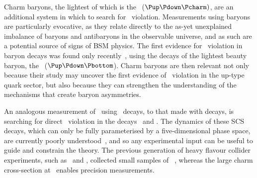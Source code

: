 
Charm baryons, the lightest of which is the \PLambdac~($\Pup\Pdown\Pcharm)$, 
are an additional system in which to search for \CP\ violation.
Measurements using baryons are particularly evocative, as they relate directly 
to the as-yet unexplained imbalance of baryons and antibaryons in the 
observable universe, and as such are a potential source of signs of \ac{BSM} 
physics.
The first evidence for \CP\ violation in baryon decays was found only 
recently~\cite{Aaij:2016cla}, using the decays of the lightest beauty baryon, 
the \PLambdab~($\Pup\Pdown\Pbottom$).
Charm baryons are then relevant not only because their study may uncover the 
first evidence of \CP\ violation in the up-type quark sector, but also because 
they can strengthen the understanding of the mechanisms that create baryon 
asymmetries.

An analogous measurement of \dACP\ using \PLambdac\ decays, to that made with 
\PDzero decays, is searching for direct \CP\ violation in the decays \LcTopKK\ 
and \LcToppipi.
The dynamics of these \ac{SCS} decays, which can only be fully parameterised by 
a five-dimensional phase space, are currently poorly 
understood~\cite{Bigi:2012ev}, and so any experimental input can be useful to 
guide and constrain the theory.
The previous generation of heavy flavour collider experiments, such as \belle\ 
and \babar, collected small samples of \PLambdac~\cite{Seuster:2005tr}, whereas 
the large charm cross-section at \lhcb\ enables precision measurements.

